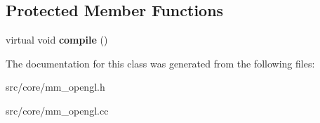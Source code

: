 \subsection*{Protected Member Functions}
\begin{DoxyCompactItemize}
\item 
\hypertarget{classmm_1_1gl_1_1_g_l_shader_af07be10ef002cad67dc9eee60563e036}{}virtual void {\bfseries compile} ()\label{classmm_1_1gl_1_1_g_l_shader_af07be10ef002cad67dc9eee60563e036}

\end{DoxyCompactItemize}


The documentation for this class was generated from the following files\+:\begin{DoxyCompactItemize}
\item 
src/core/mm\+\_\+opengl.\+h\item 
src/core/mm\+\_\+opengl.\+cc\end{DoxyCompactItemize}
